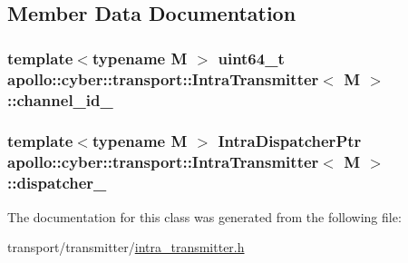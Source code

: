 \subsection{Member Data Documentation}
\hypertarget{classapollo_1_1cyber_1_1transport_1_1IntraTransmitter_ae0d14adfb5f776a9698b3d6e5f883216}{
\subsubsection[{channel\-\_\-id\-\_\-}]{\setlength{\rightskip}{0pt plus 5cm}template$<$typename M $>$ uint64\-\_\-t {\bf apollo\-::cyber\-::transport\-::\-Intra\-Transmitter}$<$ M $>$\-::channel\-\_\-id\-\_\-\hspace{0.3cm}{\ttfamily [private]}}}\label{classapollo_1_1cyber_1_1transport_1_1IntraTransmitter_ae0d14adfb5f776a9698b3d6e5f883216}
\hypertarget{classapollo_1_1cyber_1_1transport_1_1IntraTransmitter_a8290039108f635c0de7cf37ae7c8b966}{
\subsubsection[{dispatcher\-\_\-}]{\setlength{\rightskip}{0pt plus 5cm}template$<$typename M $>$ {\bf Intra\-Dispatcher\-Ptr} {\bf apollo\-::cyber\-::transport\-::\-Intra\-Transmitter}$<$ M $>$\-::dispatcher\-\_\-\hspace{0.3cm}{\ttfamily [private]}}}\label{classapollo_1_1cyber_1_1transport_1_1IntraTransmitter_a8290039108f635c0de7cf37ae7c8b966}


The documentation for this class was generated from the following file\-:\begin{DoxyCompactItemize}
\item 
transport/transmitter/\hyperlink{intra__transmitter_8h}{intra\-\_\-transmitter.\-h}\end{DoxyCompactItemize}
